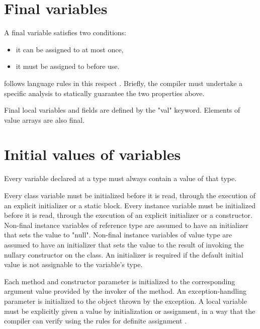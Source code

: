 \section{Final variables}\label{FinalVariable}
A final variable satisfies two conditions: 
\begin{itemize}
\item it can be assigned to at most once, 
\item it must be assigned to before use. 
\end{itemize}

\Xten{} follows \java{} language rules in this respect \cite[\S
4.5.4,8.3.1.2,16]{jls2}. Briefly, the compiler must undertake a
specific analysis to statically guarantee the two properties above.

Final local variables and fields are defined by the \xcd"val"
keyword.  Elements of value arrays are also final.


\section{Initial values of variables}
\label{NullaryConstructor}

Every variable declared at a type must always contain a value of that type.

Every class variable must be initialized before it is read, through
the execution of an explicit initializer or a static block. Every
instance variable must be initialized before it is read, through the
execution of an explicit initializer or a constructor.
Non-final instance variables of reference type are 
assumed to have an initializer that sets the value to \xcd"null".
Non-final instance variables of value type are 
assumed to have an initializer that sets the value to the
result of invoking the nullary constructor on the class. 
An initializer is required if the default initial value is not
assignable to the variable's type.

Each method and constructor parameter is initialized to the
corresponding argument value provided by the invoker of the method. An
exception-handling parameter is initialized to the object thrown by
the exception. A local variable must be explicitly given a value by
initialization or assignment, in a way that the compiler can verify
using the rules for definite assignment \cite[\S~16]{jls2}.

